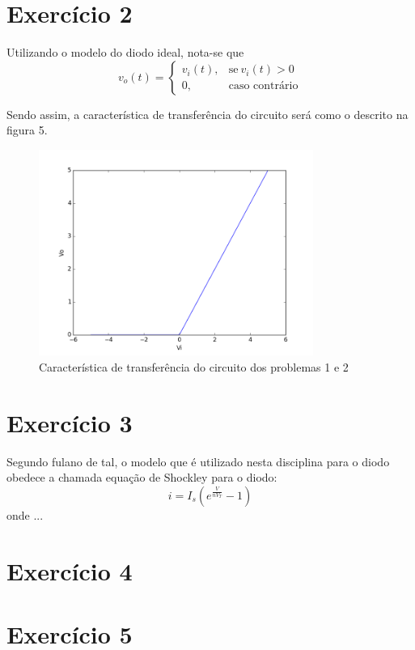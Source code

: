 \documentclass[12pt, a4paper, twoside]{article}
\begin{document}
\section{Exercício 2}

Utilizando o modelo do diodo ideal, nota-se que
\begin{equation}
    v_o(t) =
    \begin{cases}
        v_i(t), & \text{se}\ v_i(t) > 0 \\
        0, & \text{caso contrário}
    \end{cases}
\end{equation}

Sendo assim, a característica de transferência do circuito será como o descrito na figura 5.

\begin{figure}
    \centering
    \includegraphics[width=0.8\textwidth]{figs/rel3/ex2.png}
    \caption{Característica de transferência do circuito dos problemas 1 e 2}
\end{figure}

\section{Exercício 3}

Segundo fulano de tal, o modelo que é utilizado nesta disciplina para o diodo obedece a
chamada equação de Shockley para o diodo:
$$i = I_s\left( e^{\frac{V}{nV_T}} - 1 \right)$$
onde ...

\section{Exercício 4}

\section{Exercício 5}
\end{document}
